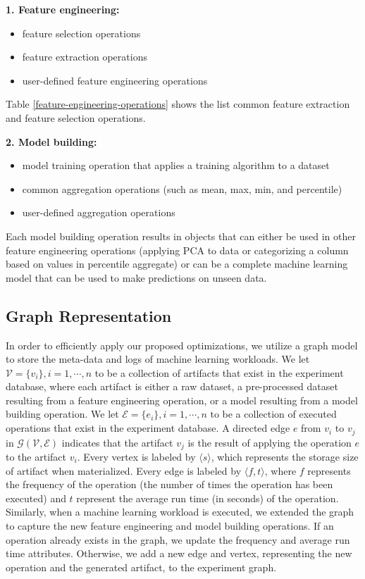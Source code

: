 \textbf{1. Feature engineering:}
\begin{itemize}
\item feature selection operations
\item feature extraction operations
\item user-defined feature engineering operations
\end{itemize}

Table \ref{feature-engineering-operations} shows the list common feature extraction and feature selection operations.

\textbf{2. Model building: }
\begin{itemize}
\item model training operation that applies a training algorithm to a dataset
\item common aggregation operations (such as mean, max, min, and percentile)
\item user-defined aggregation operations 
\end{itemize}
Each model building operation results in objects that can either be used in other feature engineering operations (applying PCA to data or categorizing a column based on values in percentile aggregate) or can be a complete machine learning model that can be used to make predictions on unseen data.

\subsection{Graph Representation}\label{sub-graph-construction}
In order to efficiently apply our proposed optimizations, we utilize a graph model to store the meta-data and logs of machine learning workloads.
We let $\mathcal{V}=\{v_i\}, i = 1, \cdots, n$ to be a collection of artifacts that exist in the experiment database, where each artifact is either a raw dataset, a pre-processed dataset resulting from a feature engineering operation, or a model resulting from a model building operation.
We let $\mathcal{E}=\{e_i\}, i = 1, \cdots, n$ to be a collection of executed operations that exist in the experiment database.
A directed edge $e$ from $v_i$ to $v_j$ in $\mathcal{G}(\mathcal{V},\mathcal{E})$ indicates that the artifact $v_j$ is the result of applying the operation $e$ to the artifact $v_i$.
Every vertex is labeled by $\langle s \rangle$, which represents the storage size of artifact when materialized.
Every edge is labeled by $\langle f, t\rangle$, where $f$ represents the frequency of the operation (the number of times the operation has been executed) and $t$ represent the average run time (in seconds) of the operation.
Similarly, when a machine learning workload is executed, we extended the graph to capture the new feature engineering and model building operations.
If an operation already exists in the graph, we update the frequency and average run time attributes.
Otherwise, we add a new edge and vertex, representing the new operation and the generated artifact, to the experiment graph.


